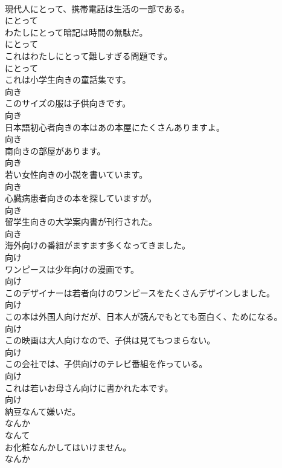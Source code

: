 \documentclass[8pt]{extreport}
\begin{document}
\begin{CJK}{UTF8}{min}
\\	現代人にとって、携帯電話は生活の一部である。	
\\	にとって	
\\	わたしにとって暗記は時間の無駄だ。	
\\	にとって	
\\	これはわたしにとって難しすぎる問題です。	
\\	にとって	
\\	これは小学生向きの童話集です。	
\\	向き	
\\	このサイズの服は子供向きです。	
\\	向き	
\\	日本語初心者向きの本はあの本屋にたくさんありますよ。	
\\	向き	
\\	南向きの部屋があります。	
\\	向き	
\\	若い女性向きの小説を書いています。	
\\	向き	
\\	心臓病患者向きの本を探していますが。	
\\	向き	
\\	留学生向きの大学案内書が刊行された。	
\\	向き	
\\	海外向けの番組がますます多くなってきました。	
\\	向け	
\\	ワンピースは少年向けの漫画です。	
\\	向け	
\\	このデザイナーは若者向けのワンピースをたくさんデザインしました。	
\\	向け	
\\	この本は外国人向けだが、日本人が読んでもとても面白く、ためになる。	
\\	向け	
\\	この映画は大人向けなので、子供は見てもつまらない。	
\\	向け	
\\	この会社では、子供向けのテレビ番組を作っている。	
\\	向け	
\\	これは若いお母さん向けに書かれた本です。	
\\	向け	
\\	納豆なんて嫌いだ。	
\\	なんか 
\\	なんて	
\\	お化粧なんかしてはいけません。	
\\	なんか 

\end{CJK}
\end{document}
